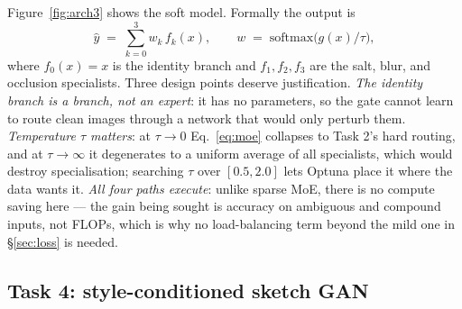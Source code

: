 \documentclass[journal]{IEEEtran}
\begin{document}
Figure~\ref{fig:arch3} shows the soft model. Formally the output is
\begin{equation}
\hat y \;=\; \sum_{k=0}^{3} w_k \, f_k(x),
\qquad
w \;=\; \mathrm{softmax}\!\big(g(x)/\tau\big),
\label{eq:moe}
\end{equation}
where $f_0(x)=x$ is the identity branch and $f_1,f_2,f_3$ are the salt, blur, and occlusion specialists. Three design points deserve justification. \emph{The identity branch is a branch, not an expert}: it has no parameters, so the gate cannot learn to route clean images through a network that would only perturb them. \emph{Temperature $\tau$ matters}: at $\tau\!\to\!0$ Eq.~\eqref{eq:moe} collapses to Task 2's hard routing, and at $\tau\!\to\!\infty$ it degenerates to a uniform average of all specialists, which would destroy specialisation; searching $\tau$ over $[0.5,2.0]$ lets Optuna place it where the data wants it. \emph{All four paths execute}: unlike sparse MoE, there is no compute saving here --- the gain being sought is accuracy on ambiguous and compound inputs, not FLOPs, which is why no load-balancing term beyond the mild one in \S\ref{sec:loss} is needed.

\subsection{Task 4: style-conditioned sketch GAN}
\label{sec:arch4}
\end{document}
